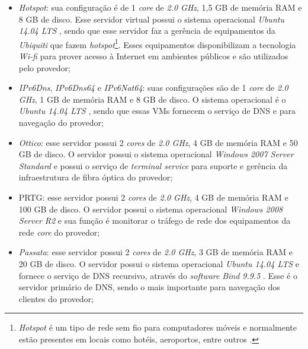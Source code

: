 \begin{itemize}
 \item \textit{Hotspot}: sua configuração é de 1 \textit{core} de \textit{2.0 GHz}, 1,5 GB de memória \ac{RAM} e 8 GB de disco. 
 Esse servidor virtual possui o sistema operacional \textit{Ubuntu 14.04 \ac{LTS}} \cite{ubuntu}, sendo que esse servidor faz a gerência de 
 equipamentos da \textit{Ubiquiti} que fazem \textit{hotspot}\footnote[1]{\textit{Hotspot} é um tipo de rede sem fio para computadores móveis 
 e normalmente estão presentes em locais como hotéis, aeroportos, entre outros \cite{tanenbaum2011}.}. Esses equipamentos disponibilizam a 
 tecnologia \textit{Wi-fi} para prover acesso à Internet em ambientes públicos e são utilizados pelo provedor;
 
 \item \textit{IPv6Dns}, \textit{IPv6Dns64} e \textit{IPv6Nat64}: suas configurações são de 1 \textit{core} de \textit{2.0 GHz}, 
 1 GB de memória \ac{RAM} e 8 GB de disco. O sistema operacional é o \textit{Ubuntu 14.04 \ac{LTS}} \cite{ubuntu}, sendo que essas \acp{VM}
 fornecem o serviço de \ac{DNS} \cite{tanenbaum2011} e  \cite{kurose2006} para navegação  \cite{ipv6} do provedor;
 
 \item \textit{Ottico}: esse servidor possui 2 \textit{cores} de \textit{2.0 GHz}, 4 GB de memória \ac{RAM} e 50 GB de disco. 
 O servidor possui o sistema operacional \textit{Windows 2007 Server Standard} e possui o serviço de \textit{terminal service} para suporte e 
 gerência da infraestrutura de fibra óptica do provedor;
 
 \item \ac{PRTG}: esse servidor possui 2 \textit{cores} de \textit{2.0 GHz}, 4 GB de memória \ac{RAM} e 100 GB de disco. 
 O servidor possui o sistema operacional \textit{Windows 2008 Server R2} e sua função é monitorar o tráfego de rede dos equipamentos da 
 rede \textit{core} do provedor;
 
 \item \textit{Passata}: esse servidor possui 2 \textit{cores} de \textit{2.0 GHz}, 3 GB de memória \ac{RAM} e 20 GB de disco. 
 O servidor possui o sistema operacional \textit{Ubuntu 14.04 \ac{LTS}} \cite{ubuntu} e fornece o serviço de \ac{DNS} recursivo, através do 
 \textit{software} \textit{Bind 9.9.5} \cite{bind}. Esse é o servidor primário de \ac{DNS}, sendo o mais importante para navegação dos clientes 
 do provedor;
 

\end{itemize}
